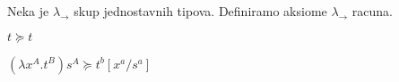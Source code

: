 \begin{definition}
  Neka je $\lambda_\to$ skup jednostavnih tipova. Definiramo aksiome $\lambda_\to$ racuna.
  \begin{enumerate*}
  
  \item \begin{center}$t \succeq t$\end{center}

  \item \begin{center}$(\lambda x^A . t ^B)s^A \succeq t^b [x^a / s^a]$\end{center}

  \item  \begin{prooftree}
    \end{prooftree}

  \item
    \begin{prooftree}
    \end{prooftree}

  \item
    \begin{prooftree}
    \end{prooftree}

  \item
    \begin{prooftree}
    \end{prooftree}


  \item
    \begin{prooftree}
    \end{prooftree}

  \item
    \begin{prooftree}
    \end{prooftree}

  \item
    \begin{prooftree}
    \end{prooftree}

  \end{enumerate*}
\end{definition}


